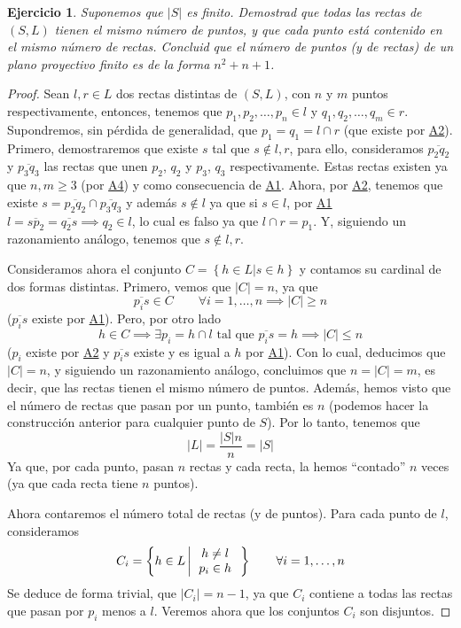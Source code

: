 \documentclass[12pt,a4paper]{article}
\newcommand\setb[1]{\left\{#1\right\}}
\newcommand{\abs}[1]{\left\vert #1 \right\vert}
\newcommand{\myref}[1]{\hyperref[item:a#1]{\uppercase{a#1}}}
\theoremstyle{break}
\newtheorem{ej}{Ejercicio}
\newtheorem*{proof}{Solución}
\begin{document}
\begin{ej}\label{ej:2}
	Suponemos que $\abs{S}$ es finito. Demostrad que todas las rectas de $(S,L)$
	tienen el mismo número de puntos, y que cada punto está contenido en el mismo
	número de rectas. Concluid que el número de puntos (y de rectas) de un plano
	proyectivo finito es de la forma $n^2 + n + 1$.
\end{ej}
\begin{proof}
	Sean $l,r \in L$ dos rectas distintas de $(S,L)$, con $n$ y $m$ puntos
	respectivamente, entonces, tenemos que $p_1, p_2, \dots, p_n \in l$ y
	$q_1,q_2,\dots,q_m \in r$. Supondremos, sin pérdida de generalidad, que
	$p_1 = q_1 = l \cap r$ (que existe por \hyperref[item:a2]{A2}). Primero,
	demostraremos que existe $s$ tal que $s \notin l,r$, para ello, consideramos
	$\overline{p_2q_2}$ y $\overline{p_3q_3}$ las rectas que unen $p_2$, $q_2$ y
	$p_3$, $q_3$ respectivamente. Estas rectas existen ya que $n,m \geq 3$ (por
	\myref{4}) y como consecuencia de \myref{1}. Ahora, por \myref{2}, tenemos que
	existe $s = \overline{p_2q_2} \cap \overline{p_3q_3}$ y además $s \notin l$ ya
	que si $s \in l$, por \myref{1} $l = \overline{sp_2} = \overline{q_2s} \implies
	q_2 \in l$, lo cual es falso ya que $l \cap r = p_1$. Y, siguiendo un
	razonamiento análogo, tenemos que $s \notin l,r$.

	Consideramos ahora el conjunto $C = \setb{h \in L \vert s \in h}$ y contamos su
	cardinal de dos formas distintas. Primero, vemos que $\abs{C} = n$, ya que
	\[
		\overline{p_is} \in C \qquad \forall i = 1,\dots,n \implies
		\abs{C} \geq n
	\]
	($\overline{p_is}$ existe por \myref{1}). Pero, por otro lado
	\[
		h \in C \implies \exists
		p_i = h \cap l \text{ tal que } \overline{p_is} = h \implies
		\abs{C} \leq n
	\]
	($p_i$ existe por \myref{2} y $\overline{p_is}$ existe y es igual a $h$ por
	\myref{1}). Con lo cual, deducimos que $\abs{C} = n$, y siguiendo un
	razonamiento análogo, concluimos que $n = \abs{C} = m$, es decir, que las
	rectas tienen el mismo número de puntos. Además, hemos visto que el número de
	rectas que pasan por un punto, también es $n$ (podemos hacer la construcción
	anterior para cualquier punto de $S$). Por lo tanto, tenemos que
	\[
		\abs{L} = \frac{\abs{S}n}{n} = \abs{S}
	\]
	Ya que, por cada punto, pasan $n$ rectas y cada recta, la hemos ``contado'' $n$
	veces (ya que cada recta tiene $n$ puntos).

	Ahora contaremos el número total de rectas (y de puntos). Para cada punto de
	$l$, consideramos
	\[
		C_i = \setb{h \in L \left\vert \begin{tabular}{c}
			$h \neq l$ \\ $p_i \in h$
		\end{tabular}\right.} \qquad \forall i = 1,\dots,n
	\]
	Se deduce de forma trivial, que $\abs{C_i} = n-1$, ya que $C_i$ contiene a
	todas las rectas que pasan por $p_i$ menos a $l$. Veremos ahora que los
	conjuntos $C_i$ son disjuntos.
	

\end{proof}
\end{document}
